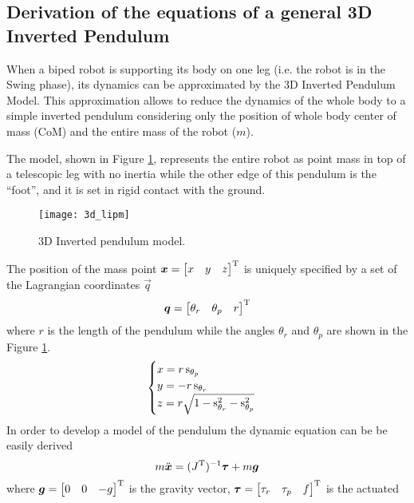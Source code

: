\subsection{Derivation of the equations of a general 3D Inverted Pendulum}
When a biped robot is supporting its body on one leg (i.e. the robot is
in the Swing phase), its dynamics can be approximated by the 3D Inverted Pendulum Model. This
approximation allows to reduce the dynamics of the whole body to a simple inverted pendulum
considering only the position of whole body center of mass (CoM) and
the entire mass of the robot ($m$).
\par
The model, shown in Figure \ref{fig:3d_lipm}, represents the entire robot as point mass in
top of a telescopic leg with no inertia while the other edge of this pendulum is the
``foot'', and it is set in rigid contact with the ground.
\begin{figure}[!ht]
  \centering
  \texttt{[image: 3d\_lipm]}
  \caption{3D Inverted pendulum model. \label{fig:3d_lipm}}
\end{figure}
\par
The position of the mass point $\boldsymbol{x} = \begin{bmatrix} x & y & z \end{bmatrix} ^{\mathrm{T}}$
is uniquely specified by a set of the Lagrangian coordinates $\vec{q}$
\[
\boldsymbol{q} =
\begin{bmatrix}
  \theta_r & \theta_p & r
\end{bmatrix}^{\mathrm{T}}
\]
where $r$ is the length of the pendulum while
the angles $\theta_r$ and $\theta_p$ are shown in the Figure \ref{fig:3d_lipm}.
\[
\begin{cases}
  x = r \mathop{}\!\mathrm{s}_{\theta_p}\\
  y = -r \mathop{}\!\mathrm{s}_{\theta_r}\\
  z = r \sqrt{1-\mathop{}\!\mathrm{s}_{\theta_r}^2-\mathop{}\!\mathrm{s}_{\theta_p}^2}
\end{cases}
\]
In order to develop a model of the pendulum the dynamic equation can be be easily derived
\begin{equation}
  \label{eq:3d_ip_inverseJ}
  m \ddot{\boldsymbol{x}} = (J^{\mathrm{T}})^{-1} \boldsymbol{\tau}  + m \boldsymbol{g}
\end{equation}
where $\boldsymbol{g} = \begin{bmatrix} 0 & 0 & -g \end{bmatrix} ^{\mathrm{T}}$ is the gravity vector,
$\boldsymbol{\tau} = \begin{bmatrix} \tau_r & \tau_p & f \end{bmatrix} ^{\mathrm{T}}$ is the actuated
